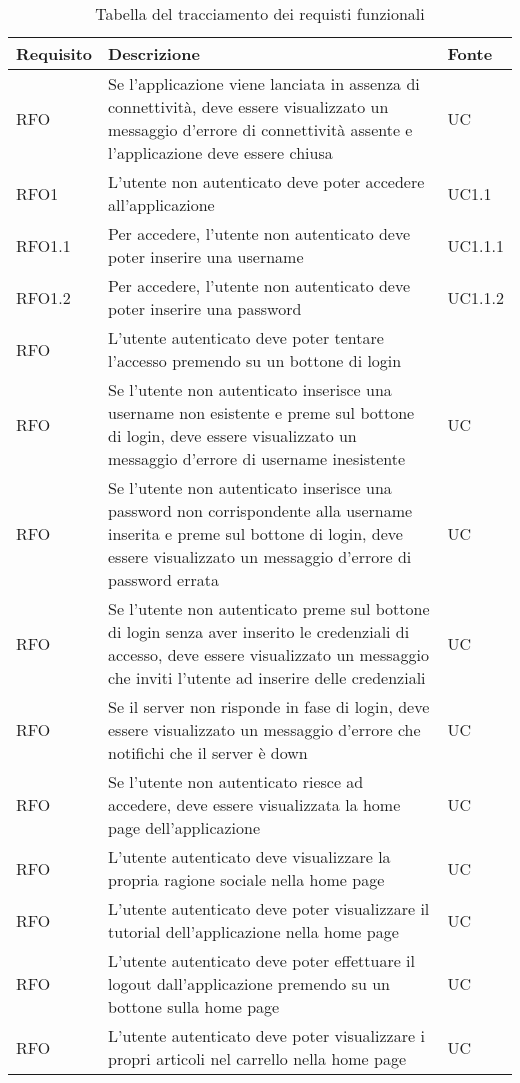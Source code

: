 \begin{table}%
\caption{Tabella del tracciamento dei requisti funzionali}
\label{tab:requisiti-funzionali}
\begin{tabularx}{\textwidth}{lXl}
\hline\hline
\textbf{Requisito} & \textbf{Descrizione} & \textbf{Fonte}\\
\hline
RFO & Se l'applicazione viene lanciata in assenza di connettività, deve essere visualizzato un messaggio d'errore di connettività assente e l'applicazione deve essere chiusa & UC \\
RFO1 & L'utente non autenticato deve poter accedere all'applicazione & UC1.1 \\
RFO1.1 & Per accedere, l'utente non autenticato deve poter inserire una username & UC1.1.1 \\
RFO1.2 & Per accedere, l'utente non autenticato deve poter inserire una password & UC1.1.2 \\
RFO & L'utente autenticato deve poter tentare l'accesso premendo su un bottone di login & \\
RFO & Se l'utente non autenticato inserisce una username non esistente e preme sul bottone di login, deve essere visualizzato un messaggio d'errore di username inesistente & UC \\
RFO & Se l'utente non autenticato inserisce una password non corrispondente alla username inserita e preme sul bottone di login, deve essere visualizzato un messaggio d'errore di password errata & UC \\
RFO & Se l'utente non autenticato preme sul bottone di login senza aver inserito le credenziali di accesso, deve essere visualizzato un messaggio che inviti l'utente ad inserire delle credenziali & UC \\
RFO & Se il server non risponde in fase di login, deve essere visualizzato un messaggio d'errore che notifichi che il server è down & UC \\
RFO & Se l'utente non autenticato riesce ad accedere, deve essere visualizzata la home page dell'applicazione & UC \\
RFO & L'utente autenticato deve visualizzare la propria ragione sociale nella home page & UC \\
RFO & L'utente autenticato deve poter visualizzare il tutorial dell'applicazione nella home page & UC \\
RFO & L'utente autenticato deve poter effettuare il logout dall'applicazione premendo su un bottone sulla home page& UC \\
RFO & L'utente autenticato deve poter visualizzare i propri articoli nel carrello nella home page & UC \\

\end{tabularx}
\end{table}
